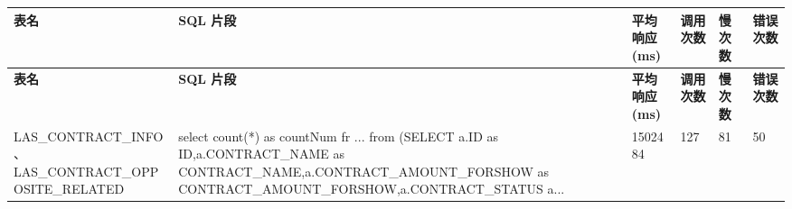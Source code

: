 \setlength{\LTleft}{0pt}
\setlength{\LTright}{0pt}
\setlength{\tabcolsep}{3.6pt}
\renewcommand{\arraystretch}{1.45}
\begin{longtable}{>{\RaggedRight\arraybackslash}p{}>{\RaggedRight\arraybackslash}p{}>{\RaggedRight\arraybackslash}p{}>{\RaggedRight\arraybackslash}p{}>{\RaggedRight\arraybackslash}p{}>{\RaggedRight\arraybackslash}p{}}
\hline
\cellcolor{HeaderBlue}\color{white}\bfseries 表名 & \cellcolor{HeaderBlue}\color{white}\bfseries SQL 片段 & \cellcolor{HeaderBlue}\color{white}\bfseries 平均响应(ms) & \cellcolor{HeaderBlue}\color{white}\bfseries 调用次数 & \cellcolor{HeaderBlue}\color{white}\bfseries 慢次数 & \cellcolor{HeaderBlue}\color{white}\bfseries 错误次数 \\
\hline
\endfirsthead
\hline
\cellcolor{HeaderBlue}\color{white}\bfseries 表名 & \cellcolor{HeaderBlue}\color{white}\bfseries SQL 片段 & \cellcolor{HeaderBlue}\color{white}\bfseries 平均响应(ms) & \cellcolor{HeaderBlue}\color{white}\bfseries 调用次数 & \cellcolor{HeaderBlue}\color{white}\bfseries 慢次数 & \cellcolor{HeaderBlue}\color{white}\bfseries 错误次数 \\
\hline
\endhead
\cellcolor{SoftBlue} LAS\_\hspace{0pt}CONTRACT\_\hspace{0pt}INFO、LAS\_\hspace{0pt}CONTRACT\_\hspace{0pt}OPPOSITE\_\hspace{0pt}RELATED & \cellcolor{SoftBlue} select count(*) as countNum fr .\hspace{0pt}.\hspace{0pt}.\hspace{0pt} from (SELECT a.\hspace{0pt}ID as ID,\hspace{0pt}a.\hspace{0pt}CONTRACT\_\hspace{0pt}NAME as CONTRACT\_\hspace{0pt}NAME,\hspace{0pt}a.\hspace{0pt}CONTRACT\_\hspace{0pt}AMOUNT\_\hspace{0pt}FORSHOW as CONTRACT\_\hspace{0pt}AMOUNT\_\hspace{0pt}FORSHOW,\hspace{0pt}a.\hspace{0pt}CONTRACT\_\hspace{0pt}STATUS a.\hspace{0pt}.\hspace{0pt}.\hspace{0pt} & \cellcolor{SoftBlue} 1502484 & \cellcolor{SoftBlue} 127 & \cellcolor{SoftBlue} 81 & \cellcolor{SoftBlue} 50 \\

\end{longtable}
